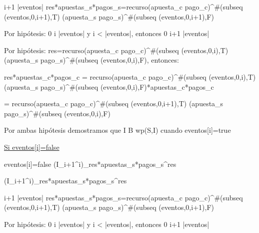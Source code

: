 \documentclass[10pt,a4paper]{article}
\begin{document}
\begin{enumerate}
		 \leq i+1 \leq |eventos| \yLuego res*apuestas_s*pagos_s=recurso(apuesta_c pago_c)^{\#(subseq (eventos,0,i+1),T)} (apuesta_s pago_s)^{\#(subseq (eventos,0,i+1),F)} 
		\vspace{2mm}
	
		Por hipótesis: 0 \leq i \leq |eventos| \hspace{3} y \hspace{3} i < |eventos|, entonces \hspace{3} 0 \leq i+1 \leq |eventos|
		\vspace{2mm}
		
		Por hipótesis: res=recurso(apuesta_c pago_c)^{\#(subseq (eventos,0,i),T)} (apuesta_s pago_s)^{\#(subseq (eventos,0,i),F)}, \hspace{3} entonces: 
		\vspace{2mm}
	
		res*apuestas_c*pagos_c = recurso(apuesta_c pago_c)^{\#(subseq (eventos,0,i),T)} (apuesta_s pago_s)^{\#(subseq (eventos,0,i),F)}*apuestas_c*pagos_c
		\vspace{2mm}
	
		= recurso(apuesta_c pago_c)^{\#(subseq (eventos,0,i+1),T)} (apuesta_s pago_s)^{\#(subseq (eventos,0,i),F)}
		\vspace{2mm}
	
		Por ambas hipótesis demostramos que I \wedge B \implica wp(S,I) \hspace{3} cuando \hspace{3} eventos[i]=true
		\vspace{2mm}
	
	
		\underline{Si eventos[i]=false}
		\vspace{2mm}
	
		eventos[i]=false \wedge (I_{i+1}^i)_{res*apuestas_s*pagos_s}^{res}
		\vspace{2mm}
	
		\equiv (I_{i+1}^i)_{res*apuestas_s*pagos_s}^{res}
		\vspace{2mm}
		
		 \leq i+1 \leq |eventos| \yLuego res*apuestas_s*pagos_s=recurso(apuesta_c pago_c)^{\#(subseq (eventos,0,i+1),T)} (apuesta_s pago_s)^{\#(subseq (eventos,0,i+1),F)} 
		\vspace{2mm}
	
		Por hipótesis: 0 \leq i \leq |eventos| \hspace{3} y \hspace{3} i < |eventos|, entonces \hspace{3} 0 \leq i+1 \leq |eventos|
		\vspace{2mm}
		

\end{enumerate}
\end{document}
